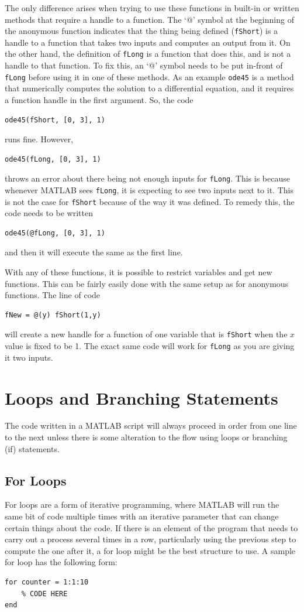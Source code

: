\documentclass{ximera}
\begin{document}
The only difference arises when trying to use these functions in built-in or written methods that require a handle to a function. The `@' symbol at the beginning of the anonymous function indicates that the thing being defined (\texttt{fShort}) is a handle to a function that takes two inputs and computes an output from it. On the other hand, the definition of \texttt{fLong} is a function that does this, and is not a handle to that function. To fix this, an `@' symbol needs to be put in-front of \texttt{fLong} before using it in one of these methods. As an example \texttt{ode45} is a method that numerically computes the solution to a differential equation, and it requires a function handle in the first argument. So, the code
\begin{verbatim}
ode45(fShort, [0, 3], 1)
\end{verbatim}
runs fine. However, 
\begin{verbatim}
ode45(fLong, [0, 3], 1)
\end{verbatim}
throws an error about there being not enough inputs for \texttt{fLong}. This is because whenever MATLAB sees \texttt{fLong}, it is expecting to see two inputs next to it. This is not the case for \texttt{fShort} because of the way it was defined. To remedy this, the code needs to be written 
\begin{verbatim}
ode45(@fLong, [0, 3], 1)
\end{verbatim}
and then it will execute the same as the first line. 

With any of these functions, it is possible to restrict variables and get new functions. This can be fairly easily done with the same setup as for anonymous functions. The line of code
\begin{verbatim}
fNew = @(y) fShort(1,y)
\end{verbatim}
will create a new handle for a function of one variable that is \texttt{fShort} when the $x$ value is fixed to be 1. The exact same code will work for \texttt{fLong} as you are giving it two inputs. 

\section{Loops and Branching Statements}

The code written in a MATLAB script will always proceed in order from one line to the next unless there is some alteration to the flow using loops or branching (if) statements. 

\subsection{For Loops}
For loops are a form of iterative programming, where MATLAB will run the same bit of code multiple times with an iterative parameter that can change certain things about the code. If there is an element of the program that needs to carry out a process several times in a row, particularly using the previous step to compute the one after it, a for loop might be the best structure to use. A sample for loop has the following form:
\begin{verbatim}
for counter = 1:1:10
    % CODE HERE
end
\end{verbatim}
\end{document}
